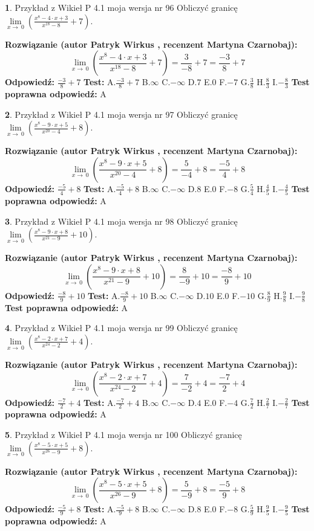 \documentclass[12pt, a4paper]{article}
\theoremstyle{definition} %
\newtheorem{zad}{}
\newcommand{\zadStart}[1]{\begin{zad}#1\newline}
\newcommand{\zadStop}{\end{zad}}
\newcommand{\rozwStart}[2]{\noindent \textbf{Rozwiązanie (autor #1 , recenzent #2): }\newline}
\newcommand{\rozwStop}{\newline}
\newcommand{\odpStart}{\noindent \textbf{Odpowiedź:}\newline}
\newcommand{\odpStop}{\newline}
\newcommand{\testStart}{\noindent \textbf{Test:}\newline}
\newcommand{\testStop}{\newline}
\newcommand{\kluczStart}{\noindent \textbf{Test poprawna odpowiedź:}\newline}
\newcommand{\kluczStop}{\newline}
\begin{document}
\zadStart{Przykład z Wikieł P 4.1 moja wersja nr 96}
Obliczyć granicę $\lim\limits_{x\to\ 0}(\frac{x^{8}-4 \cdot x +3}{x^{18}-8}+7)$.
\zadStop
\rozwStart{Patryk Wirkus}{Martyna Czarnobaj}
$$\lim\limits_{x\to\ 0}(\frac{x^{8}-4 \cdot x +3}{x^{18}-8}+7)=\frac{3}{-8}+7=\frac{-3}{8}+7$$
\rozwStop
\odpStart
$\frac{-3}{8}+7$
\odpStop
\testStart
A.$\frac{-3}{8}+7$
B.$\infty$
C.$-\infty$
D.$7$
E.$0$
F.$-7$
G.$\frac{3}{8}$
H.$\frac{8}{3}$
I.$-\frac{8}{3}$
\testStop
\kluczStart
A
\kluczStop



\zadStart{Przykład z Wikieł P 4.1 moja wersja nr 97}
Obliczyć granicę $\lim\limits_{x\to\ 0}(\frac{x^{8}-9 \cdot x +5}{x^{20}-4}+8)$.
\zadStop
\rozwStart{Patryk Wirkus}{Martyna Czarnobaj}
$$\lim\limits_{x\to\ 0}(\frac{x^{8}-9 \cdot x +5}{x^{20}-4}+8)=\frac{5}{-4}+8=\frac{-5}{4}+8$$
\rozwStop
\odpStart
$\frac{-5}{4}+8$
\odpStop
\testStart
A.$\frac{-5}{4}+8$
B.$\infty$
C.$-\infty$
D.$8$
E.$0$
F.$-8$
G.$\frac{5}{4}$
H.$\frac{4}{5}$
I.$-\frac{4}{5}$
\testStop
\kluczStart
A
\kluczStop



\zadStart{Przykład z Wikieł P 4.1 moja wersja nr 98}
Obliczyć granicę $\lim\limits_{x\to\ 0}(\frac{x^{8}-9 \cdot x +8}{x^{21}-9}+10)$.
\zadStop
\rozwStart{Patryk Wirkus}{Martyna Czarnobaj}
$$\lim\limits_{x\to\ 0}(\frac{x^{8}-9 \cdot x +8}{x^{21}-9}+10)=\frac{8}{-9}+10=\frac{-8}{9}+10$$
\rozwStop
\odpStart
$\frac{-8}{9}+10$
\odpStop
\testStart
A.$\frac{-8}{9}+10$
B.$\infty$
C.$-\infty$
D.$10$
E.$0$
F.$-10$
G.$\frac{8}{9}$
H.$\frac{9}{8}$
I.$-\frac{9}{8}$
\testStop
\kluczStart
A
\kluczStop



\zadStart{Przykład z Wikieł P 4.1 moja wersja nr 99}
Obliczyć granicę $\lim\limits_{x\to\ 0}(\frac{x^{8}-2 \cdot x +7}{x^{24}-2}+4)$.
\zadStop
\rozwStart{Patryk Wirkus}{Martyna Czarnobaj}
$$\lim\limits_{x\to\ 0}(\frac{x^{8}-2 \cdot x +7}{x^{24}-2}+4)=\frac{7}{-2}+4=\frac{-7}{2}+4$$
\rozwStop
\odpStart
$\frac{-7}{2}+4$
\odpStop
\testStart
A.$\frac{-7}{2}+4$
B.$\infty$
C.$-\infty$
D.$4$
E.$0$
F.$-4$
G.$\frac{7}{2}$
H.$\frac{2}{7}$
I.$-\frac{2}{7}$
\testStop
\kluczStart
A
\kluczStop



\zadStart{Przykład z Wikieł P 4.1 moja wersja nr 100}
Obliczyć granicę $\lim\limits_{x\to\ 0}(\frac{x^{8}-5 \cdot x +5}{x^{26}-9}+8)$.
\zadStop
\rozwStart{Patryk Wirkus}{Martyna Czarnobaj}
$$\lim\limits_{x\to\ 0}(\frac{x^{8}-5 \cdot x +5}{x^{26}-9}+8)=\frac{5}{-9}+8=\frac{-5}{9}+8$$
\rozwStop
\odpStart
$\frac{-5}{9}+8$
\odpStop
\testStart
A.$\frac{-5}{9}+8$
B.$\infty$
C.$-\infty$
D.$8$
E.$0$
F.$-8$
G.$\frac{5}{9}$
H.$\frac{9}{5}$
I.$-\frac{9}{5}$
\testStop
\kluczStart
A
\kluczStop
\end{document}
